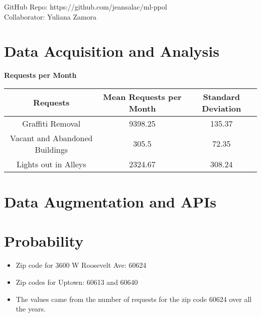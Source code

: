 \documentclass[letterpaper,12pt]{article}
\begin{document}
\maketitle
\begin{center}
GitHub Repo: https://github.com/jeansalac/ml-ppol \\
Collaborator: Yuliana Zamora
\end{center}

\section{Data Acquisition and Analysis}
\begin{center}
\textbf{Requests per Month} \\
\begin{tabular}{ |c|c|c| } 
 \hline
 \textbf{Requests} & \textbf{Mean Requests per Month} & \textbf{Standard Deviation} \\ 
 \hline
 Graffiti Removal & 9398.25 & 135.37 \\ 
 \hline
 Vacant and Abandoned Buildings & 305.5 & 72.35 \\ 
 \hline
 Lights out in Alleys & 2324.67 & 308.24 \\
 \hline
\end{tabular}
\end{center}


\section{Data Augmentation and APIs}

\section{Probability}
\begin{itemize}
\item Zip code for 3600 W Roosevelt Ave: 60624
\item Zip codes for Uptown: 60613 and 60640
\item The values came from the number of requests for the zip code 60624 over all the years.
\end{itemize}
\end{document}
